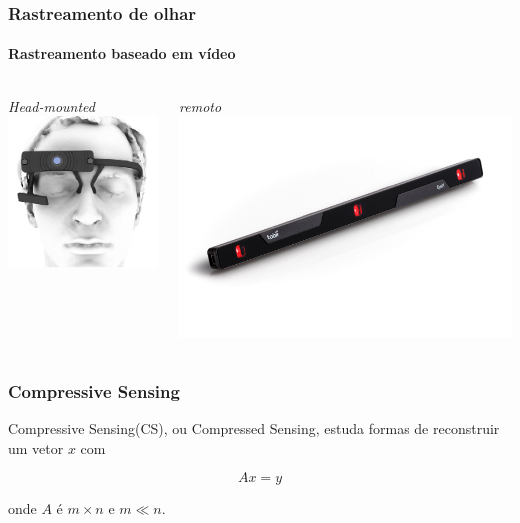 \documentclass[11pt]{beamer}
\begin{document}
\begin{frame}
\frametitle{Rastreamento de olhar}
\framesubtitle{Rastreamento baseado em vídeo}
\begin{columns}[t]
\centering
\textit{Head-mounted}
\includegraphics[scale=.6]{imagens/pupil.png}

\centering
\textit{remoto}
\includegraphics[scale=1]{imagens/eyex.jpg}
\end{columns}
\end{frame}

\begin{frame}
\frametitle{Compressive Sensing}
Compressive Sensing(CS), ou Compressed Sensing, estuda formas de reconstruir um vetor $x$ com

$$ Ax = y$$

onde $A$ é $m \times n$ e $m \ll n$.
\end{frame}
\end{document}

